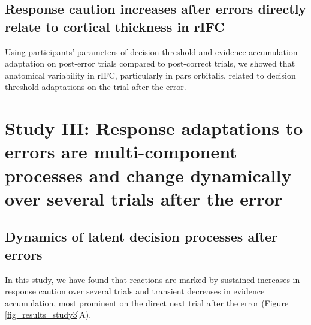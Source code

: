 \documentclass[12pt,openany]{book}
\theoremstyle{definition}
\theoremstyle{definition}
\theoremstyle{definition}
\theoremstyle{remark}
\begin{document}
\subsection{Response caution increases after errors directly relate to
cortical thickness in
rIFC}\label{response-caution-increases-after-errors-directly-relate-to-cortical-thickness-in-rifc}

Using participants' parameters of decision threshold and evidence
accumulation adaptation on post-error trials compared to post-correct
trials, we showed that anatomical variability in rIFC, particularly in
pars orbitalis, related to decision threshold adaptations on the trial
after the error.

\section{Study III: Response adaptations to errors are multi-component
processes and change dynamically over several trials after the
error}\label{study-iii-response-adaptations-to-errors-are-multi-component-processes-and-change-dynamically-over-several-trials-after-the-error}

\subsection{Dynamics of latent decision processes after
errors}\label{dynamics-of-latent-decision-processes-after-errors}

In this study, we have found that reactions are marked by sustained
increases in response caution over several trials and transient
decreases in evidence accumulation, most prominent on the direct next
trial after the error (Figure \ref{fig_results_study3}A).
\end{document}
